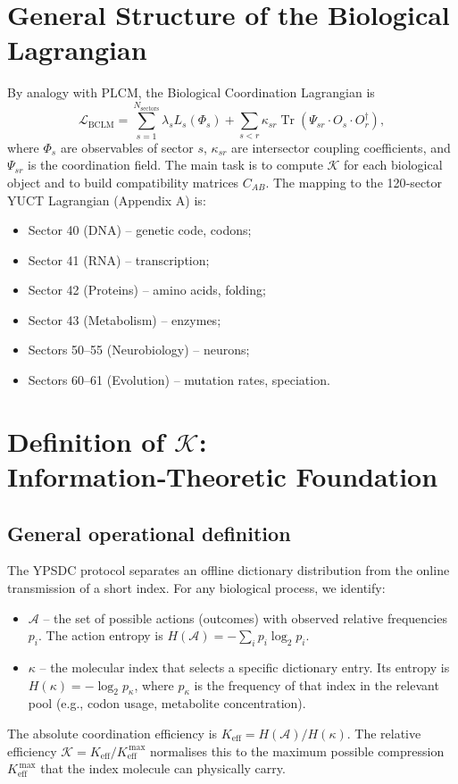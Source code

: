 \documentclass[12pt,a4paper]{article}
\newcommand{\REL}{\mathcal{K}}          %
\newcommand{\ABS}{K_{\mathrm{eff}}}     %
\begin{document}
	\section{General Structure of the Biological Lagrangian}
	By analogy with PLCM, the Biological Coordination Lagrangian is
	\begin{equation}
		\mathcal{L}_{\text{BCLM}} = \sum_{s=1}^{N_{\text{sectors}}} \lambda_s L_s(\Phi_s) + \sum_{s<r} \kappa_{sr} \operatorname{Tr}(\Psi_{sr} \cdot O_s \cdot O_r^\dagger),
		\label{eq:BCLM}
	\end{equation}
	where \(\Phi_s\) are observables of sector \(s\), \(\kappa_{sr}\) are intersector coupling coefficients, and \(\Psi_{sr}\) is the coordination field. The main task is to compute \(\REL\) for each biological object and to build compatibility matrices \(C_{AB}\). The mapping to the 120‑sector YUCT Lagrangian (Appendix A) is:
	\begin{itemize}
		\item Sector 40 (DNA) – genetic code, codons;
		\item Sector 41 (RNA) – transcription;
		\item Sector 42 (Proteins) – amino acids, folding;
		\item Sector 43 (Metabolism) – enzymes;
		\item Sectors 50–55 (Neurobiology) – neurons;
		\item Sectors 60–61 (Evolution) – mutation rates, speciation.
	\end{itemize}
	
	\section{Definition of \(\REL\): Information‑Theoretic Foundation}
	\label{sec:REL-def}
	
	\subsection{General operational definition}
	The YPSDC protocol separates an offline dictionary distribution from the online transmission of a short index. For any biological process, we identify:
	\begin{itemize}
		\item \(\mathcal{A}\) – the set of possible actions (outcomes) with observed relative frequencies \(p_i\). The action entropy is \(H(\mathcal{A}) = -\sum_i p_i \log_2 p_i\).
		\item \(\kappa\) – the molecular index that selects a specific dictionary entry. Its entropy is \(H(\kappa) = -\log_2 p_\kappa\), where \(p_\kappa\) is the frequency of that index in the relevant pool (e.g., codon usage, metabolite concentration).
	\end{itemize}
	The absolute coordination efficiency is \(\ABS = H(\mathcal{A})/H(\kappa)\). The relative efficiency \(\REL = \ABS / \ABS^{\,\max}\) normalises this to the maximum possible compression \(\ABS^{\,\max}\) that the index molecule can physically carry.
	
\end{document}
